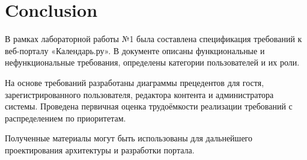 
\newpage
\section{Conclusion}

В рамках лабораторной работы №1 была составлена спецификация
требований к веб-порталу «Календарь.ру». В документе описаны
функциональные и нефункциональные требования, определены
категории пользователей и их роли.

На основе требований разработаны диаграммы прецедентов для
гостя, зарегистрированного пользователя, редактора контента
и администратора системы. Проведена первичная оценка трудоёмкости
реализации требований с распределением по приоритетам.

Полученные материалы могут быть использованы для дальнейшего
проектирования архитектуры и разработки портала.

